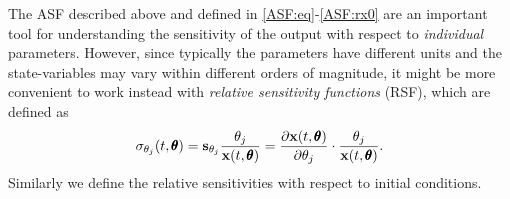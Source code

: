 \documentclass[a4paper, 12pt]{article}
\begin{document}
The ASF described above and defined in \eqref{ASF:eq}-\eqref{ASF:rx0} are an important tool for understanding the sensitivity of the output with respect to \emph{individual} parameters. However, since  typically the parameters have different units and the state-variables may vary within different orders of magnitude,  it might be more convenient to work instead with \emph{relative sensitivity functions} (RSF), which are defined as \cite{OlufOtt13}
\begin{equation}\label{RSF}
\sigma_{\theta_j}(t,{\pmb{\theta}})= \mathbf{s}_{\theta_j}\frac{\theta_j}{\mathbf{x}(t,{\pmb{\theta}})} =\frac{\partial \mathbf{x}(t,{\pmb{\theta}})}{\partial \theta_j} \cdot  \frac{\theta_j}{\mathbf{x}(t,{\pmb{\theta}})} .
\end{equation}
Similarly we define the  relative sensitivities with respect to initial conditions.
\end{document}
